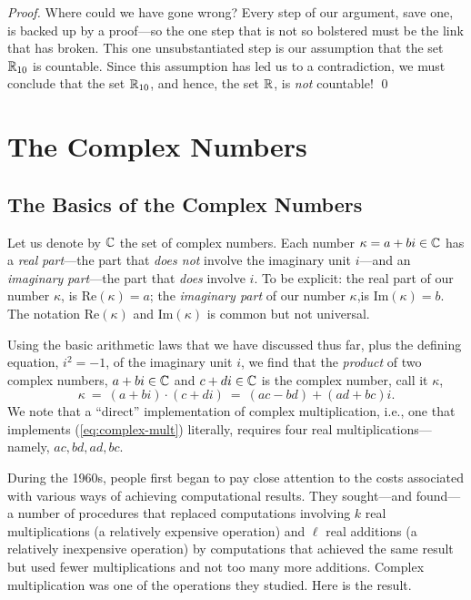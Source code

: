 \begin{proof}
Where could we have gone wrong?  Every step of our argument, save one,
is backed up by a proof---so the one step that is not so bolstered
must be the link that has broken.  This one unsubstantiated step is
our assumption that the set $\mathbb{R}_{10}$ is countable.  Since this
assumption has led us to a contradiction, we must conclude that the
set $\mathbb{R}_{10}$, and hence, the set $\mathbb{R}$, is {\em not} countable!
\qed
\end{proof}



\section{The Complex Numbers}
\label{sec:complexes}


\subsection{The Basics of the Complex Numbers}

Let us denote by $\mathbb{C}$ the set of complex numbers.  Each number $\kappa
= a+bi \in \mathbb{C}$ has a {\it real}  {\em
  part}---the part that {\em does not} involve the imaginary unit
 $i$---and an {\it imaginary}
 {\em part}---the part that {\em
  does} involve $i$.  To be explicit: the real part of our number
$\kappa$, is  Re$(\kappa)
= a$; the {\it imaginary part} of our number $\kappa$,is
 Im$(\kappa) = b$.
 The notation
Re$(\kappa)$ and Im$(\kappa)$ is common but not universal.

Using the basic arithmetic laws that we have discussed thus far, plus
the defining equation, $i^2 = -1$, of the imaginary unit $i$, we find
that the {\em product} of two complex numbers, $a+bi \in \mathbb{C}$ and $c+di
\in \mathbb{C}$ is the complex number, call it $\kappa$,
\begin{equation}
\label{eq:complex-mult}
\kappa \ = \ (a+bi) \cdot (c+di) \ = \ (ac - bd) + (ad + bc)i.
\end{equation}
We note that a ``direct'' implementation of complex multiplication,
i.e., one that implements (\ref{eq:complex-mult}) literally, requires
four real multiplications---namely, $ac, bd, ad, bc$.

During the 1960s, people first began to pay close attention to the
costs associated with various ways of achieving computational results.
They sought---and found---a number of procedures that replaced
computations involving $k$ real multiplications (a relatively
expensive operation) and $\ell$ real additions (a relatively
inexpensive operation) by computations that achieved the same result
but used fewer multiplications and not too many more additions.
Complex multiplication was one of the operations they studied.  Here
is the result.

